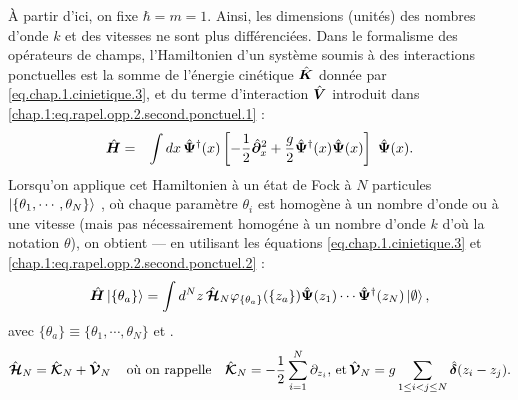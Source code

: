 À partir d’ici, on fixe $\hbar = m = 1 $. Ainsi, les dimensions (unités) des nombres d’onde $k$ et des vitesses ne sont plus différenciées.
Dans le formalisme des opérateurs de champs, l’Hamiltonien d’un système soumis à des interactions ponctuelles est la somme de l’énergie cinétique $\hat{\bm{K}}$ donnée par \eqref{eq.chap.1.cinietique.3}, et du terme d’interaction $\hat{\bm{V}}$ introduit dans \eqref{chap.1:eq.rapel.opp.2.second.ponctuel.1} :
\begin{eqnarray}\label{chap.1:eq.LL.champ.1}
	\operator{H} & = & \int dx \, \operator{\Psi}^\dag (x)\left [-\frac{1}{2}\operator{\partial}_x^2 + \frac{g}{2}  \operator{\Psi}^\dag (x) \operator{\Psi} (x) \right ] \operator{\Psi} (x) \label{chap:1:ham.mod}.
\end{eqnarray}
Lorsqu’on applique cet Hamiltonien à un état de Fock à $N$ particules $\ket{\{\theta_1 , \cdots , \theta_N \}} $, où chaque paramètre $\theta_i$ est homogène à un nombre d’onde ou à une vitesse (mais pas nécessairement homogéne à un nombre d'onde $k$ d’où la notation $\theta$), on obtient — en utilisant les équations \eqref{eq.chap.1.cinietique.3} et \eqref{chap.1:eq.rapel.opp.2.second.ponctuel.2} : %
\begin{eqnarray}\label{chap.1:eq.LL.champ.2}
	\hat{\bm{H}}\ket{\{\theta_a\}} =  \int d^Nz \, \hat{\bm{\mathcal{H}}}_N \varphi_{\{\theta_a\}}(\{z_a\})\hat{\bm{\Psi}}(z_1)\cdots \hat{\bm{\Psi}}^\dag(z_N) \ket{\emptyset}, 
\end{eqnarray}
avec $\{\theta_a\} \equiv \{ \theta_1 , \cdots , \theta_N \} $ et .
\begin{eqnarray}\label{chap.1:eq.LL.eta.1}
\hat{\bm{\mathcal{H}}}_N  =  \hat{\bm{\mathcal{K}}}_N  +  \hat{\bm{\mathcal{V}}}_N \, \quad \mbox{où on rappelle} \quad \hat{\bm{\mathcal{K}}}_N = -\frac{1}2\sum_{i=1}^N \partial_{z_i} , \,  \mbox{et} \, 	\hat{\bm{\mathcal{V}}}_N = g\sum_{1\leq i < j \leq N } \hat{\bm{\delta}}(z_i - z_j)	. 
\end{eqnarray}

